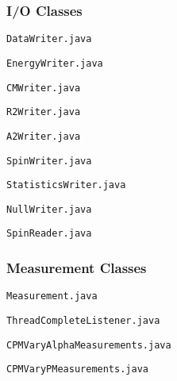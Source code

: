 \documentclass[a4paper,12pt]{article}
\newcommand*{\MyPath}{/Users/MichaelChiang/Dropbox/Edinburgh/Courses/Year 3/SH_Project/cell_potts_model}%
\begin{document}
\subsubsection{I/O Classes}
\noindent\texttt{DataWriter.java}

\vspace*{0.5cm}
\noindent\texttt{EnergyWriter.java}

\vspace*{0.5cm}
\noindent\texttt{CMWriter.java}

\vspace*{0.5cm}
\noindent\texttt{R2Writer.java}

\vspace*{0.5cm}
\noindent\texttt{A2Writer.java}

\vspace*{0.5cm}
\noindent\texttt{SpinWriter.java}

\vspace*{0.5cm}
\noindent\texttt{StatisticsWriter.java}

\vspace*{0.5cm}
\noindent\texttt{NullWriter.java}

\vspace*{0.5cm}
\noindent\texttt{SpinReader.java}


\subsubsection{Measurement Classes}

\noindent\texttt{Measurement.java}

\vspace*{0.5cm}
\noindent\texttt{ThreadCompleteListener.java}

\vspace*{0.5cm}
\noindent\texttt{CPMVaryAlphaMeasurements.java}

\vspace*{0.5cm}
\noindent\texttt{CPMVaryPMeasurements.java}

\end{document}
